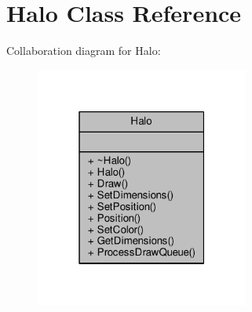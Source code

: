 \hypertarget{classHalo}{}\section{Halo Class Reference}
\label{classHalo}


Collaboration diagram for Halo\+:
\nopagebreak
\begin{figure}[H]
\begin{center}
\leavevmode
\includegraphics[width=199pt]{dd/d66/classHalo__coll__graph}
\end{center}
\end{figure}

